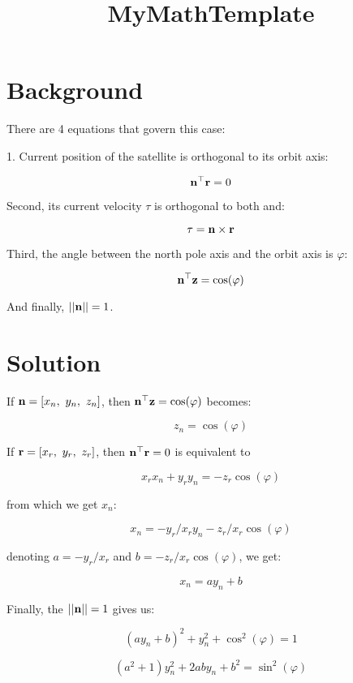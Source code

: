 \documentclass[12pt]{article}
\title{MyMathTemplate}
\begin{document}

\section{Background}

There are 4 equations that govern this case:

1. Current position of the satellite is orthogonal to its orbit axis:

$$\mathbf{n}^\top \mathbf{r} = 0$$

Second, its current velocity $\tau$ is orthogonal to both and:

$$\tau = \mathbf{n} \times \mathbf{r}$$

Third, the angle between the north pole axis and the orbit axis is $\varphi$:

$$\mathbf{n}^\top \mathbf{z} = \cos(\varphi)$$

And finally, $||\mathbf{n}|| = 1$.

\section{Solution}

If $\mathbf{n} = [x_n, \ y_n, \ z_n]$, then $\mathbf{n}^\top \mathbf{z} = \cos(\varphi)$ becomes:

$$z_n = \cos(\varphi)$$

If $\mathbf{r} = [x_r, \ y_r, \ z_r]$, then $\mathbf{n}^\top \mathbf{r} = 0$ is equivalent to 

$$x_r x_n + y_r y_n = -z_r \cos(\varphi)$$

from which we get $x_n$:

$$x_n = - y_r/x_r y_n -z_r/x_r \cos(\varphi)$$

denoting $a = - y_r/x_r$ and $b = -z_r/x_r \cos(\varphi)$, we get:

$$ x_n = a y_n + b$$

Finally, the $||\mathbf{n}|| = 1$ gives us:

$$ (a y_n + b)^2 + y_n^2 + \cos^2(\varphi) = 1$$

$$ (a^2 + 1)y_n^2 +2ab y_n + b^2 = \sin^2(\varphi)$$
\end{document}
